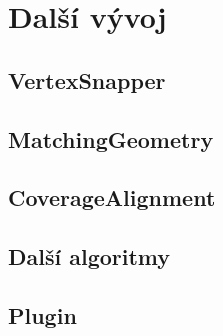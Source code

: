 \chapter{Další vývoj}
\label{9-vyvoj}

\section{VertexSnapper}




\section{MatchingGeometry}



\section{CoverageAlignment}



\section{Další algoritmy}


\section{Plugin}
